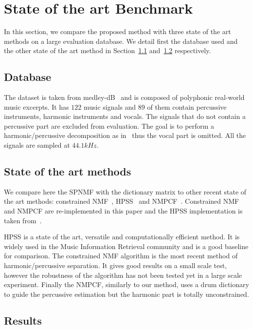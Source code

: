
\section{State of the art Benchmark}
\label{sec:stateoftheart}

In this section, we compare the proposed method with three state of the art methods on a large evaluation database. We detail first the database used and the other state of the art method in Section~\ref{database} and~\ref{soth} respectively.  


\subsection{Database}
\label{database}

The dataset is taken from medley-dB~\cite{bittner2014medleydb} and is composed of polyphonic real-world music excerpts. It has $122$ music signals and $89$ of them contain percussive instruments, harmonic instruments and vocals. The signals that do not contain a percussive part are excluded from evaluation. The goal is to perform a harmonic/percussive decomposition as in~\cite{canadas2014percussive} thus the vocal part is omitted. All the signals are sampled at $44.1kHz$.

\subsection{State of the art methods}
\label{soth}

We compare here the SPNMF with the dictionary matrix to other recent state of the art methods: constrained NMF~\cite{canadas2014percussive}, HPSS~\cite{fitzgerald2010harmonic} and NMPCF~\cite{kim2011nonnegative}. Constrained NMF and NMPCF are re-implemented in this paper and the HPSS implementation is taken from~\cite{DriedgerMueller14_TSMToolbox_DAFX}.

HPSS is a state of the art, versatile and computationally efficient method. It is widely used in the Music Information Retrieval community and is a good baseline for comparison. The constrained NMF algorithm is the most recent method of harmonic/percussive separation. It gives good results on a small scale test, however the robustness of the algorithm has not been tested yet in a large scale experiment. Finally the NMPCF, similarly to our method, uses a drum dictionary to guide the percussive estimation but the harmonic part is totally unconstrained. 


\subsection{Results} 
\label{subResults}

